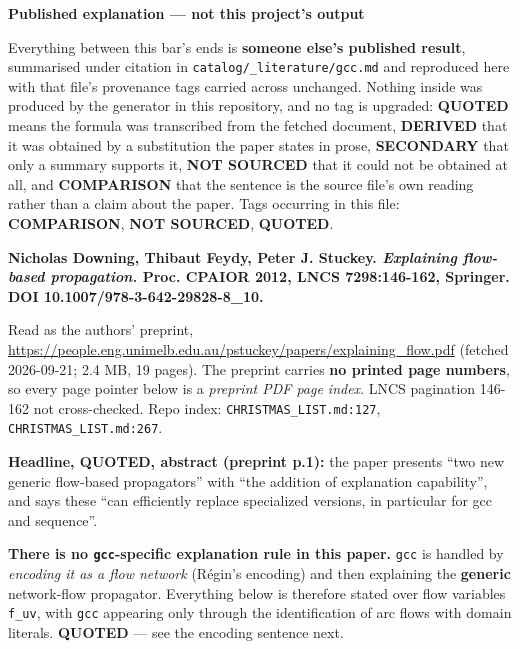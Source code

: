 \documentclass[10pt,a4paper]{article}
\newcommand{\provtag}[2]{{\small\sffamily\bfseries\textcolor{#1}{#2}}}
\newenvironment{pubblock}{%
  \par\smallskip
  \def\FrameCommand{\textcolor{litbar}{\vrule width 2.5pt}\hspace{9pt}}%
  \MakeFramed{\advance\hsize-\width\FrameRestore}}%
  {\endMakeFramed\par\smallskip}
\newcommand{\pubhead}[1]{{\sffamily\bfseries\large\textcolor{litbar}{#1}\par}}
\newcommand{\litsub}[1]{\par\smallskip{\sffamily\bfseries\textcolor{litbar}{#1}\par}}
\begin{document}
\begin{pubblock}
\pubhead{Published explanation --- not this project's output}
{\small\sffamily Everything between this bar's ends is \textbf{someone else's published result}, summarised under citation in \texttt{catalog/\_\allowbreak{}literature/gcc.md} and reproduced here with that file's provenance tags carried across unchanged. Nothing inside was produced by the generator in this repository, and no tag is upgraded: \provtag{tagquoted}{QUOTED} means the formula was transcribed from the fetched document, \provtag{tagderived}{DERIVED} that it was obtained by a substitution the paper states in prose, \provtag{tagsecondary}{SECONDARY} that only a summary supports it, \provtag{tagnotsourced}{NOT SOURCED} that it could not be obtained at all, and \provtag{tagcomparison}{COMPARISON} that the sentence is the source file's own reading rather than a claim about the paper. Tags occurring in this file: \provtag{tagcomparison}{COMPARISON}, \provtag{tagnotsourced}{NOT SOURCED}, \provtag{tagquoted}{QUOTED}.\par}
\litsub{Citation}
\textbf{Nicholas Downing, Thibaut Feydy, Peter J. Stuckey. \emph{Explaining flow-based propagation.} Proc. CPAIOR 2012, LNCS 7298:146-162, Springer. DOI 10.1007/978-3-642-29828-8\_10.}

Read as the authors' preprint, \url{https://people.eng.unimelb.edu.au/pstuckey/papers/explaining_flow.pdf} (fetched 2026-09-21; 2.4 MB, 19 pages). The preprint carries \textbf{no printed page numbers}, so every page pointer below is a \emph{preprint PDF page index}. LNCS pagination 146-162 not cross-checked. Repo index: \texttt{CHRISTMAS\_LIST.md:127}, \texttt{CHRISTMAS\_LIST.md:267}.

\textbf{Headline, \provtag{tagquoted}{QUOTED}, abstract (preprint p.1):} the paper presents ``two new generic flow-based propagators'' with ``the addition of explanation capability'', and says these ``can efficiently replace specialized versions, in particular for gcc and sequence''.

\par\smallskip
\litsub{The structural fact the catalog most needs}
\textbf{There is no \texttt{gcc}-specific explanation rule in this paper.} \texttt{gcc} is handled by \emph{encoding it as a flow network} (R\'egin's encoding) and then explaining the \textbf{generic} network-flow propagator. Everything below is therefore stated over flow variables \texttt{f\_uv}, with \texttt{gcc} appearing only through the identification of arc flows with domain literals. \provtag{tagquoted}{QUOTED} --- see the encoding sentence next.


\end{pubblock}
\end{document}
